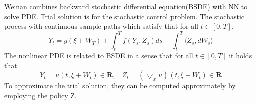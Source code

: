 \documentclass{article}
\begin{document}
Weinan\cite{weinan} combines backward stochastic differential equation(BSDE) with NN to solve PDE.
Trial solution is for the stochastic control problem.
The stochastic process with continuous sample paths which satisfy that for all $t \in [0,T]$.
\begin{equation}
Y_t = g(\xi + W_T) + \int_{t}^{T}f(Y_s,Z_s)ds - \int_{t}^{T}\langle  Z_s,dW_s \rangle
\end{equation}
The nonlinear PDE is related to BSDE in a sense that for all $t \in [0,T]$ it holds that
\begin{equation}
Y_t = u(t,\xi + W_t) \in \mathbf{R}, \ \ \ \ Z_t=(\bigtriangledown_{x}u)(t,\xi + W_t) \in \mathbf{R}
\end{equation}
To approximate the trial solution, they can be computed approximately by employing the policy Z.




\end{document}

